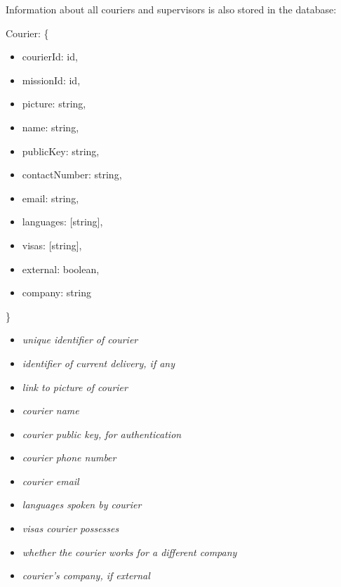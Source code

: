 Information about all couriers and supervisors is also stored in the database:

\begin{minipage}{6.5cm}
    Courier: \{
    \begin{itemize}
        \itemsep-0.5em
        \item[] courierId: id,
        \item[] missionId: id,
        \item[] picture: string,
        \item[] name: string,
        \item[] publicKey: string,
        \item[] contactNumber: string,
        \item[] email: string,
        \item[] languages: [string],
        \item[] visas: [string],
        \item[] external: boolean,
        \item[] company: string
    \end{itemize}
    \}
\end{minipage}
\begin{minipage}{10cm}
    \hspace{1cm}
    \begin{itemize}
        \itemsep-0.5em
        \item[] \textit{unique identifier of courier}
        \item[] \textit{identifier of current delivery, if any}
        \item[] \textit{link to picture of courier}
        \item[] \textit{courier name}
        \item[] \textit{courier public key, for authentication}
        \item[] \textit{courier phone number}
        \item[] \textit{courier email}
        \item[] \textit{languages spoken by courier}
        \item[] \textit{visas courier possesses}
        \item[] \textit{whether the courier works for a different company}
        \item[] \textit{courier's company, if external}
    \end{itemize}
    \hspace{1cm}
\end{minipage}

